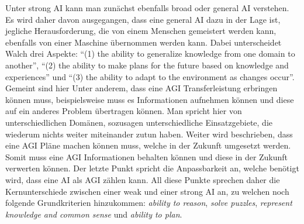             Unter strong AI kann man zunächst ebenfalls broad oder general AI verstehen.\cite{walch_world_2019}
            Es wird daher davon ausgegangen, dass eine general AI dazu in der Lage ist, jegliche Herausforderung,
            die von einem Menschen gemeistert werden kann, ebenfalls von einer Maschine übernommen werden kann.
            Dabei unterscheidet Walch drei Aspekte: ``(1) the ability to generalize knowledge from one domain to
            another'', ``(2) the ability to make plans for the future based on knowledge and experiences'' und
            ``(3) the ability to adapt to the environment as changes occur''. Gemeint sind hier Unter anderem,
            dass eine AGI Transferleistung erbringen können muss, beispielsweise muss es Informationen aufnehmen
            können und diese auf ein anderes Problem übertragen können. Man spricht hier von unterschiedlichen
            Domänen, sozusagen unterschiedliche Einsatzgebiete, die wiederum nichts weiter miteinander zutun
            haben. \cite{walch_world_2019} Weiter wird beschrieben, dass eine AGI Pläne machen können muss,
            welche in der Zukunft umgesetzt werden. Somit muss eine AGI Informationen behalten können und diese
            in der Zukunft verwerten können. Der letzte Punkt spricht die Anpassbarkeit an, welche benötigt
            wird, dass eine AI als AGI zählen kann. All diese Punkte sprechen daher die Kernunterschiede zwischen
            einer weak und einer strong AI an, zu welchen noch folgende Grundkriterien hinzukommen:
            \textit{ability to reason}, \textit{solve puzzles}, \textit{represent knowledge and common sense} und
            \textit{ability to plan}.

